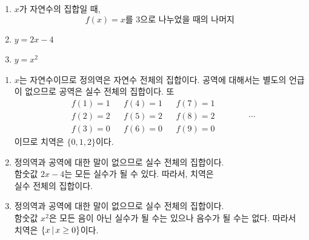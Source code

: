 \documentclass{oblivoir}
\begin{document}
\vspace{-15pt}
%
\begin{enumerate}[itemsep=0pt]\label{function6}
\item
\(x\)가 자연수의 집합일 때,\\
\vspace{-15pt}
\[f(x)=x\text{를 3으로 나누었을 때의 나머지}\]
\item
\(y=2x-4\)%
\item
\(y=x^2\)
\end{enumerate}
\begin{mdframed}
\begin{enumerate}
\item
\(x\)는 자연수이므로 정의역은 자연수 전체의 집합이다.
공역에 대해서는 별도의 언급이 없으므로 공역은 실수 전체의 집합이다.
또
\begin{align*}
&f(1)=1&&f(4)=1&&f(7)=1\\
&f(2)=2&&f(5)=2&&f(8)=2\qquad\qquad\cdots\\
&f(3)=0&&f(6)=0&&f(9)=0
\end{align*}
이므로 치역은 \(\{0,1,2\}\)이다.
\item
정의역과 공역에 대한 말이 없으므로 실수 전체의 집합이다.\\
함숫값 \(2x-4\)는 모든 실수가 될 수 있다.
따라서, 치역은\\ 실수 전체의 집합이다.
\item
정의역과 공역에 대한 말이 없으므로 실수 전체의 집합이다.\\
함숫값 \(x^2\)은 모든 음이 아닌 실수가 될 수는 있으나 음수가 될 수는 없다.
따라서 치역은 \(\{x\,|\, x\ge0\}\)이다.
\end{enumerate}
\end{mdframed}
\end{document}
